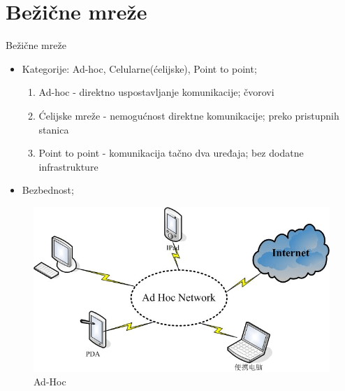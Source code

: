 \documentclass{beamer}
\begin{document}
\section{Bežične mreže}
\begin{frame}{Bežične mreže}

\begin{itemize}
\item Kategorije: Ad-hoc, Celularne(ćelijske), Point to point;
\begin{enumerate}
    \item Ad-hoc - direktno uspostavljanje komunikacije; čvorovi
    \item Ćelijske mreže - nemogućnost direktne komunikacije; preko pristupnih stanica 
    \item Point to point - komunikacija tačno dva uređaja; bez dodatne infrastrukture
\end{enumerate}
\item Bezbednost;
\end{itemize}

\begin{figure}[ht!]
\begin{center}
\includegraphics[scale=0.25]{AdHoc.png}
\end{center}
\caption{Ad-Hoc}
\label{fig:adhoc}
\end{figure}
\end{frame} 
\end{document}
